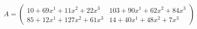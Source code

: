 \documentclass[preview]{standalone}
\begin{document}
\begin{align*}
A = \begin{pmatrix}10 + 69x^{1} + 11x^{2} + 22x^{3} & 103 + 90x^{1} + 62x^{2} + 84x^{3} \\ 85 + 12x^{1} + 127x^{2} + 61x^{3} & 14 + 40x^{1} + 48x^{2} + 7x^{3}\end{pmatrix}
\end{align*}
\end{document}
